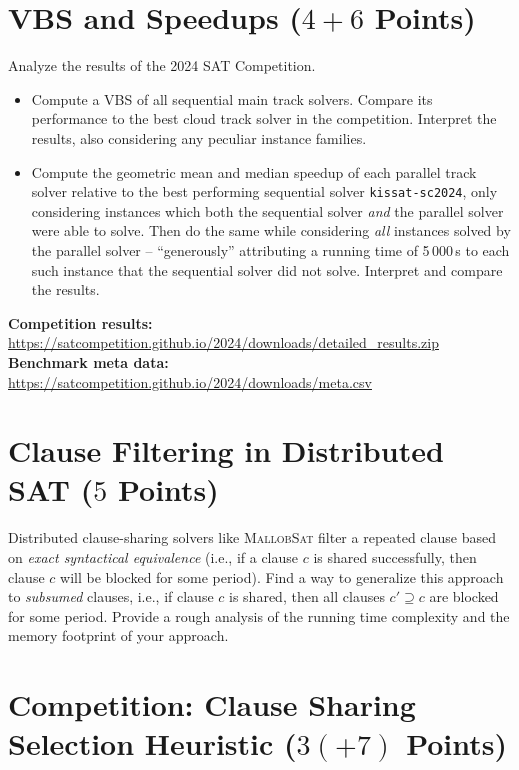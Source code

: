 \documentclass[a4paper]{article}
\begin{document}
\section{VBS and Speedups ($4+6$ Points)}

Analyze the results of the 2024 SAT Competition.
\begin{itemize}
	\item[(a)] Compute a VBS of all sequential main track solvers.
	Compare its performance to the best cloud track solver in the competition.
	Interpret the results, also considering any peculiar instance families.
	\item[(b)] Compute the geometric mean and median speedup of each parallel track solver relative to the best performing sequential solver \texttt{kissat-sc2024}, only considering instances which both the sequential solver \emph{and} the parallel solver were able to solve.
	Then do the same while considering \textit{all} instances solved by the parallel solver -- ``generously'' attributing a running time of 5\,000\,s to each such instance that the sequential solver did not solve.
	Interpret and compare the results.
\end{itemize}

\noindent
\textbf{Competition results:} \url{https://satcompetition.github.io/2024/downloads/detailed_results.zip}\\
\textbf{Benchmark meta data:}
\url{https://satcompetition.github.io/2024/downloads/meta.csv}


\section{Clause Filtering in Distributed SAT ($5$ Points)}

Distributed clause-sharing solvers like \textsc{MallobSat} filter a repeated clause based on \textit{exact syntactical equivalence} (i.e., if a clause $c$ is shared successfully, then clause $c$ will be blocked for some period).
Find a way to generalize this approach to \textit{subsumed} clauses, i.e., if clause $c$ is shared, then all clauses $c' \supseteq c$ are blocked for some period.
Provide a rough analysis of the running time complexity and the memory footprint of your approach.


\section{Competition: Clause Sharing Selection Heuristic ($3 (+7)$ Points)}
\end{document}
